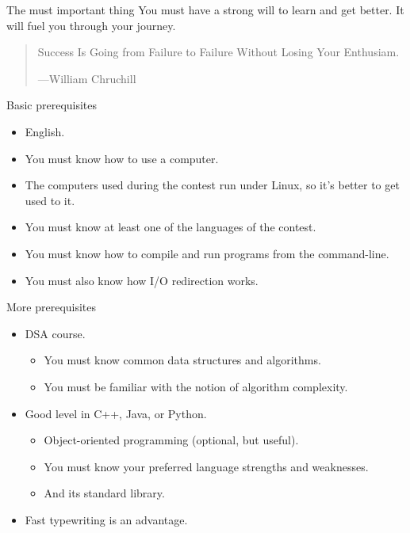 \documentclass{beamer}
\begin{document}
\begin{frame}{The must important thing}
You must have a strong will to learn and get better. It will fuel you through your journey.
\vspace{12pt}
\begin{tcolorbox}[boxrule=0mm]
  \begin{quote}
    Success Is Going from Failure to Failure Without Losing Your Enthusiam.
    \begin{flushright}
      \tiny{---William Chruchill}
    \end{flushright}
  \end{quote}
\end{tcolorbox}
\end{frame}

\begin{frame}{Basic prerequisites}
  \begin{itemize}
    \justifying
    \item English.
    \item You must know how to use a computer.
    \item The computers used during the contest run under Linux, so it's better to get used to it.
    \item You must know at least one of the languages of the contest.
    \item You must know how to compile and run programs from the command-line.
    \item You must also know how I/O redirection works.
  \end{itemize}
\end{frame}

\begin{frame}{More prerequisites}
\begin{itemize}
  \justifying
  \item DSA course.
  \begin{itemize}
    \justifying
    \item You must know common data structures and algorithms.
    \item You must be familiar with the notion of algorithm complexity.
  \end{itemize}
  \item Good level in C++, Java, or Python.
  \begin{itemize}
     \justifying
    \item Object-oriented programming (optional, but useful).
    \item You must know your preferred language strengths and weaknesses.
    \item And its standard library.
  \end{itemize}
  \item Fast typewriting is an advantage. 
\end{itemize}
\end{frame}
\end{document}

